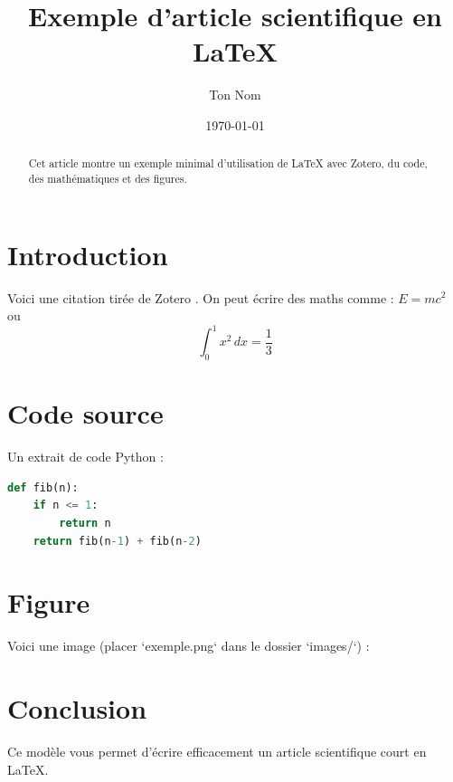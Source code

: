 \documentclass[a4paper,11pt]{article}
\title{Exemple d'article scientifique en \LaTeX}
\author{Ton Nom}
\date{\today}
\begin{document}
\maketitle

\begin{abstract}
    Cet article montre un exemple minimal d’utilisation de \LaTeX{} avec Zotero, du code, des mathématiques et des figures.
\end{abstract}

\section{Introduction}

Voici une citation tirée de Zotero \cite{wuResearchProcessPath2024}.
On peut écrire des maths comme : \( E = mc^2 \) ou
\[
    \int_0^1 x^2\,dx = \frac{1}{3}
\]

\section{Code source}

Un extrait de code Python :

\begin{lstlisting}[language=Python, caption=Exemple de code Python]
def fib(n):
    if n <= 1:
        return n
    return fib(n-1) + fib(n-2)
\end{lstlisting}

\section{Figure}

Voici une image (placer `exemple.png` dans le dossier `images/`) :


\section{Conclusion}

Ce modèle vous permet d’écrire efficacement un article scientifique court en LaTeX.

\printbibliography
\end{document}
